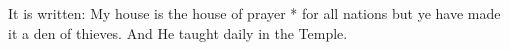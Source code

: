 It is written: My house is the house of prayer * for all nations but ye have made it a den of thieves. And He taught daily in the Temple.